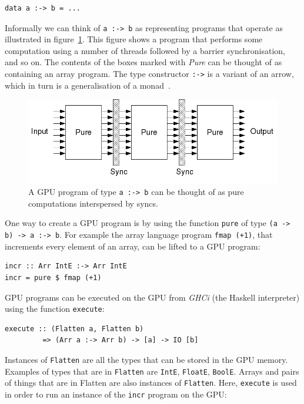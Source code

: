 \begin{small}
\begin{verbatim} 
data a :-> b = ... 
\end{verbatim}
\end{small} 
\noindent
\noindent
Informally we can think of {\tt a\nolinebreak~:->\nolinebreak~b} as representing programs that operate 
as illustrated in figure~\ref{fig:program}. This figure 
shows a program that performs some computation using a number of threads 
followed by a barrier synchronisation, and so on. The contents of the 
boxes marked with {\em Pure} can be thought of as containing an array 
program.%
The type constructor {\tt :->} is a variant of an arrow, which in turn is a generalisation of a monad~\cite{JSTECH}.
%
\begin{figure}
\begin{center}
\includegraphics[width=.60\linewidth]{./papp/pictures/prg_intuit.jpg}
\caption{A GPU program of type  {\tt a :-> b} can be thought 
of as pure computations interspersed by syncs.}
\label{fig:program}
\end{center}
\end{figure}
\noindent
One way to create a GPU program is by using the function {\tt pure} of type {\tt (a -> b) -> a :-> b}.
For example the array language program {\tt fmap (+1)}, that increments 
every element of an array, can be lifted to a GPU program: 
%
\begin{small}
\begin{verbatim}
incr :: Arr IntE :-> Arr IntE 
incr = pure $ fmap (+1)
\end{verbatim}
\end{small} 
 \noindent
GPU programs can be executed on the GPU from
{\em GHCi} (the Haskell interpreter) using the function {\tt execute}: 

\begin{small}
\begin{verbatim}
execute :: (Flatten a, Flatten b) 
         => (Arr a :-> Arr b) -> [a] -> IO [b]
\end{verbatim}
\end{small}
\noindent
Instances of {\tt Flatten} are all the types that can be stored in the 
GPU memory. Examples of types that are in {\tt Flatten} are {\tt IntE}, 
{\tt FloatE}, {\tt BoolE}. Arrays and pairs of things that are in Flatten 
are also instances of {\tt Flatten}.
Here, {\tt execute} is used in order to run an instance of the {\tt incr} 
program on the GPU:

